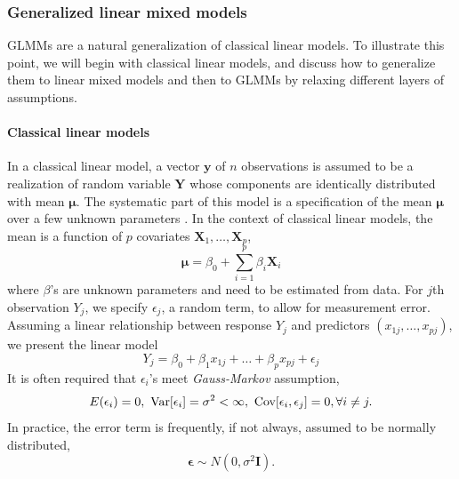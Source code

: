 \subsubsection{Generalized linear mixed models}\label{subsubsec:intro-stat-framework}
GLMMs are a natural generalization of classical linear models. To illustrate this point, we will
begin with classical linear models, and discuss how to generalize them to linear mixed models and
then to GLMMs by relaxing different layers of assumptions. 
\paragraph{Classical linear models}\label{para:clm}
In a classical linear model, a vector $\bm y$ of $n$ observations is assumed to be a realization
of random variable $\bm Y$ whose components are identically distributed with mean $\bm \mu$. The
systematic part of this model is a specification of the mean $\bm\mu$ over a few unknown parameters
\citep{mccullagh1989generalized}. In the context of classical linear models, the mean is a function
of $p$ covariates $\bm X_1, \ldots, \bm X_p$,
\begin{equation}\label{eq:clm}
	\bm \mu =\beta_0 + \sum_{i=1}^p\beta_i \bm X_i
\end{equation}	
where $\beta$'s are unknown parameters and need to be estimated from data. For
$j$th %
 observation $Y_j$, we specify $\epsilon_j$, a random term, to allow for measurement error.
Assuming a linear relationship between response $Y_j$ and predictors $(x_{1j}, \ldots, x_{pj})$, we
present the linear model 
\begin{equation}\label{eq:clm2}
	Y_j= \beta_0 + \beta_1x_{1j} + \ldots + \beta_p x_{pj} + \epsilon_j
\end{equation}
It is often required that $\epsilon_i$'s meet \textit{Gauss-Markov} assumption,
\begin{equation}\label{eq:gauss-markov}
	E(\epsilon_i)=0,~ \text{Var}[\epsilon_i]=
	\sigma^2<\infty, ~\text{Cov}[\epsilon_i, \epsilon_j]=0, \forall i \neq j.
\end{equation}
In practice, the error term is frequently, if not always, assumed to be normally distributed, 
\begin{equation}\label{eq:normalassumption}
	\bm \epsilon \sim N(0, \sigma^2 \bm I).
\end{equation}

